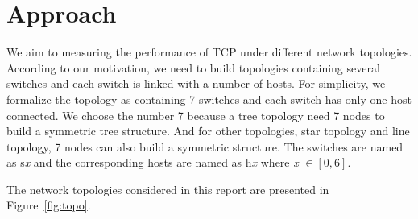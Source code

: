 \section{Approach} \label{sec:approach}

We aim to measuring the performance of TCP under different network topologies.
According to our motivation, we need to build topologies containing several
switches and each switch is linked with a number of hosts. For simplicity,
we formalize the topology as containing 7 switches and each switch has only 
one host connected. We choose the number 7 because a tree topology need 7 nodes
to build a symmetric tree structure. And for other topologies, \eg star topology
and line topology, 7 nodes can also build a symmetric structure. The switches are named
as s{\it x} and the corresponding hosts are named as h{\it x} where {\it x} $\in [0, 6]$.

The network topologies considered in this report are presented in Figure~\ref{fig:topo}.

